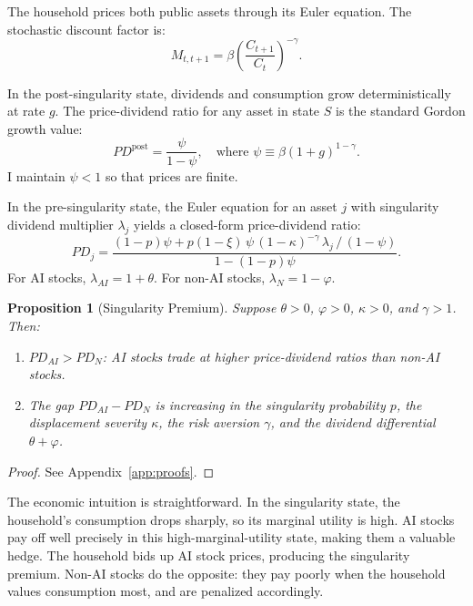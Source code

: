 \documentclass[12pt]{article}
\newtheorem{proposition}{Proposition}
\begin{document}
The household prices both public assets through its Euler equation. The stochastic discount factor is:
\begin{equation}
  M_{t,t+1} = \beta \left(\frac{C_{t+1}}{C_t}\right)^{-\gamma}. \label{eq:sdf} %
\end{equation}

In the post-singularity state, dividends and consumption grow deterministically at rate $g$. The price-dividend ratio for any asset in state $S$ is the standard Gordon growth value:
\begin{equation}
  PD^{\text{post}} = \frac{\psi}{1 - \psi}, \quad \text{where } \psi \equiv \beta(1+g)^{1-\gamma}. \label{eq:pd_post} %
\end{equation}
I maintain $\psi < 1$ so that prices are finite.

In the pre-singularity state, the Euler equation for an asset $j$ with singularity dividend multiplier $\lambda_j$ yields a closed-form price-dividend ratio:
\begin{equation}
  PD_j = \frac{(1-p)\psi + p(1-\xi)\,\psi\,(1-\kappa)^{-\gamma}\,\lambda_j\,/\,(1-\psi)}{1 - (1-p)\psi}. \label{eq:pd_pre} %
\end{equation}
For AI stocks, $\lambda_{AI} = 1+\theta$. For non-AI stocks, $\lambda_N = 1 - \varphi$.

\begin{proposition}[Singularity Premium] \label{prop:premium} %
Suppose $\theta > 0$, $\varphi > 0$, $\kappa > 0$, and $\gamma > 1$. Then:
\begin{enumerate}
  \item[(a)] $PD_{AI} > PD_N$: AI stocks trade at higher price-dividend ratios than non-AI stocks.
  \item[(b)] The gap $PD_{AI} - PD_N$ is increasing in the singularity probability $p$, the displacement severity $\kappa$, the risk aversion $\gamma$, and the dividend differential $\theta + \varphi$.
\end{enumerate}
\end{proposition}

\begin{proof}
See Appendix~\ref{app:proofs}.
\end{proof}

The economic intuition is straightforward. In the singularity state, the household's consumption drops sharply, so its marginal utility is high. AI stocks pay off well precisely in this high-marginal-utility state, making them a valuable hedge. The household bids up AI stock prices, producing the singularity premium. Non-AI stocks do the opposite: they pay poorly when the household values consumption most, and are penalized accordingly.
\end{document}

